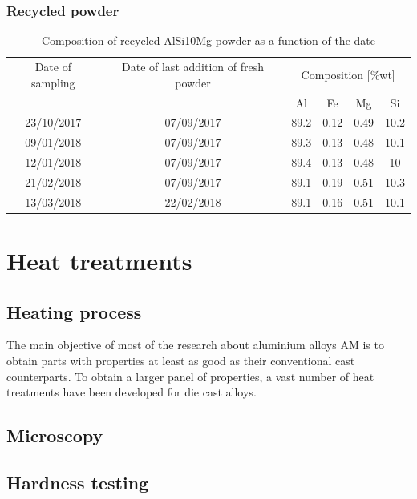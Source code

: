 \subsubsection{Recycled powder}
 \begin{center}
\begin{table}[ht]
\begin{tabular}{|c|c |c |c| c|c|}
    \hline
    Date of sampling& Date of last addition of fresh powder & \multicolumn{4}{c}{Composition [\%wt]} \vline\\
    \cline{3-6}
    & & Al& Fe&Mg&Si\\
\hline 
\hline   
    23/10/2017 & 07/09/2017 &89.2&0.12&0.49&10.2\\
    09/01/2018 & 07/09/2017 & 89.3 & 0.13 &0.48&10.1\\
    12/01/2018 & 07/09/2017 & 89.4 & 0.13 &0.48&10\\
    21/02/2018& 07/09/2017 &89.1&0.19&0.51&10.3\\
    13/03/2018& 22/02/2018 &89.1&0.16&0.51&10.1\\    
    \hline
\end{tabular}

\caption[Composition of recycled AlSi10Mg powder as a function of the date]{Composition of recycled AlSi10Mg powder as a function of the date}
\label{tab:compo}
\end{table}
 \end{center}

\section{Heat treatments}

\subsection{Heating process}

The main objective of most of the research about aluminium alloys AM is to obtain parts with properties at least as good as their conventional cast counterparts. To obtain a larger panel of properties, a vast number of heat treatments have been developed for die cast alloys. 

\subsection{Microscopy}

\subsection{Hardness testing}

